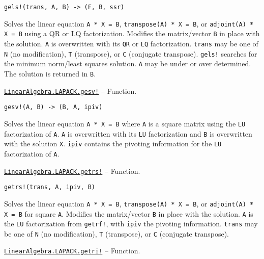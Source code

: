 \begin{adjustwidth}{2em}{0pt}


\begin{verbatim}
gels!(trans, A, B) -> (F, B, ssr)
\end{verbatim}

Solves the linear equation \texttt{A * X = B}, \texttt{transpose(A) * X = B}, or \texttt{adjoint(A) * X = B} using a QR or LQ factorization. Modifies the matrix/vector \texttt{B} in place with the solution. \texttt{A} is overwritten with its \texttt{QR} or \texttt{LQ} factorization. \texttt{trans} may be one of \texttt{N} (no modification), \texttt{T} (transpose), or \texttt{C} (conjugate transpose). \texttt{gels!} searches for the minimum norm/least squares solution. \texttt{A} may be under or over determined. The solution is returned in \texttt{B}.



\end{adjustwidth}
\hypertarget{1148095264829123239}{}
\hyperlink{1148095264829123239}{\texttt{LinearAlgebra.LAPACK.gesv!}}  -- {Function.}

\begin{adjustwidth}{2em}{0pt}


\begin{verbatim}
gesv!(A, B) -> (B, A, ipiv)
\end{verbatim}

Solves the linear equation \texttt{A * X = B} where \texttt{A} is a square matrix using the \texttt{LU} factorization of \texttt{A}. \texttt{A} is overwritten with its \texttt{LU} factorization and \texttt{B} is overwritten with the solution \texttt{X}. \texttt{ipiv} contains the pivoting information for the \texttt{LU} factorization of \texttt{A}.



\end{adjustwidth}
\hypertarget{16091201483800894861}{}
\hyperlink{16091201483800894861}{\texttt{LinearAlgebra.LAPACK.getrs!}}  -- {Function.}

\begin{adjustwidth}{2em}{0pt}


\begin{verbatim}
getrs!(trans, A, ipiv, B)
\end{verbatim}

Solves the linear equation \texttt{A * X = B}, \texttt{transpose(A) * X = B}, or \texttt{adjoint(A) * X = B} for square \texttt{A}. Modifies the matrix/vector \texttt{B} in place with the solution. \texttt{A} is the \texttt{LU} factorization from \texttt{getrf!}, with \texttt{ipiv} the pivoting information. \texttt{trans} may be one of \texttt{N} (no modification), \texttt{T} (transpose), or \texttt{C} (conjugate transpose).



\end{adjustwidth}
\hypertarget{14980283213207275035}{}
\hyperlink{14980283213207275035}{\texttt{LinearAlgebra.LAPACK.getri!}}  -- {Function.}

